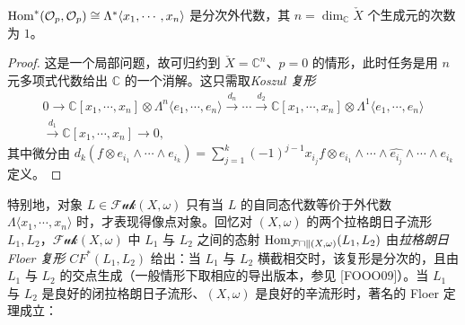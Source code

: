 
\begin{lemma*}
$\operatorname{Hom}^{\ast}(\mathcal{O}_p,\mathcal{O}_p)\cong\Lambda^{\ast}\langle x_1,\dotsb,x_n\rangle$ 是分次外代数，其 $n=\dim_{\mathbb{C}}\check{X}$ 个生成元的次数为 $1$。
\end{lemma*}


\begin{proof}
这是一个局部问题，故可归约到 $\check{X}=\mathbb{C}^n$、$p=0$ 的情形，此时任务是用 $n$ 元多项式代数给出 $\mathbb{C}$ 的一个消解。这只需取\emph{Koszul 复形}
\begin{multline*}
  0\to \mathbb{C}[x_1,\dotsb,x_n]\otimes\Lambda^n\langle e_1,\dotsb,e_n\rangle
  \xrightarrow{d_n}\dotsb\xrightarrow{d_2}
  \mathbb{C}[x_1,\dotsb,x_n]\otimes\Lambda^1\langle e_1,\dotsb,e_n\rangle\\
  \xrightarrow{d_1}\mathbb{C}[x_1,\dotsb,x_n]\to 0,
\end{multline*}
其中微分由 $d_k(f\otimes e_{i_1}\wedge\dotsb\wedge e_{i_k})=\sum_{j=1}^k(-1)^{j-1}x_{i_j}f\otimes e_{i_1}\wedge\dotsb\wedge\widehat{e_{i_j}}\wedge\dotsb\wedge e_{i_k}$ 定义。
\end{proof}


特别地，对象 $L\in\mathcal{Fuk}(X,\omega)$ 只有当 $L$ 的自同态代数等价于外代数 $\Lambda\langle x_1,\dotsb,x_n\rangle$ 时，才表现得像点对象。回忆对 $(X,\omega)$ 的两个拉格朗日子流形 $L_1,L_2$，$\mathcal{Fuk}(X,\omega)$ 中 $L_1$ 与 $L_2$ 之间的态射 $\operatorname{Hom}_{\mathcal{Fuk}(X,\omega)}(L_1,L_2)$ 由\emph{拉格朗日 Floer 复形} $CF^{\ast}(L_1,L_2)$ 给出：当 $L_1$ 与 $L_2$ 横截相交时，该复形是分次的，且由 $L_1$ 与 $L_2$ 的交点生成（一般情形下取相应的导出版本，参见 [FOOO09]）。当 $L_1$ 与 $L_2$ 是良好的闭拉格朗日子流形、$(X,\omega)$ 是良好的辛流形时，著名的 Floer 定理成立：

